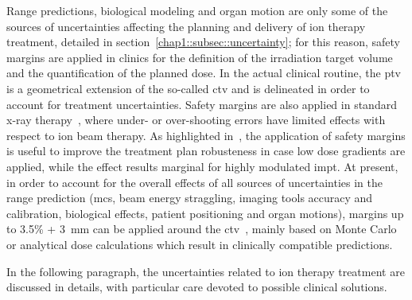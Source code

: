 Range predictions, biological modeling and organ motion are only some of the sources of uncertainties affecting the planning and delivery of ion therapy treatment, detailed in section~\ref{chap1::subsec::uncertainty}; for this reason, safety margins  are applied in clinics for the definition of the irradiation target volume and the quantification of the planned dose. In the actual clinical routine, the \gls{ptv} is a geometrical extension of the so-called \gls{ctv} and is delineated in order to account for treatment uncertainties. Safety margins are also applied in standard x-ray therapy~\parencite{McKenzie2000}, where under- or over-shooting errors have limited effects with respect to ion beam therapy. As highlighted in~\cite{Albertini2011}, the application of safety margins is useful to improve the treatment plan robusteness in case low dose gradients are applied, while the effect results marginal for highly modulated \gls{impt}. At present, in order to account for the overall effects of all sources of uncertainties in the range prediction (\gls{mcs}, beam energy straggling, imaging tools accuracy and calibration, biological effects, patient positioning and organ motions), margins up to 3.5\% + 3~mm can be applied around the \gls{ctv}~\parencite{Paganetti2012}, mainly based on Monte Carlo or analytical dose calculations which result in clinically compatible predictions. 

In the following paragraph, the uncertainties related to ion therapy treatment are discussed in details, with particular care devoted to possible clinical solutions.

